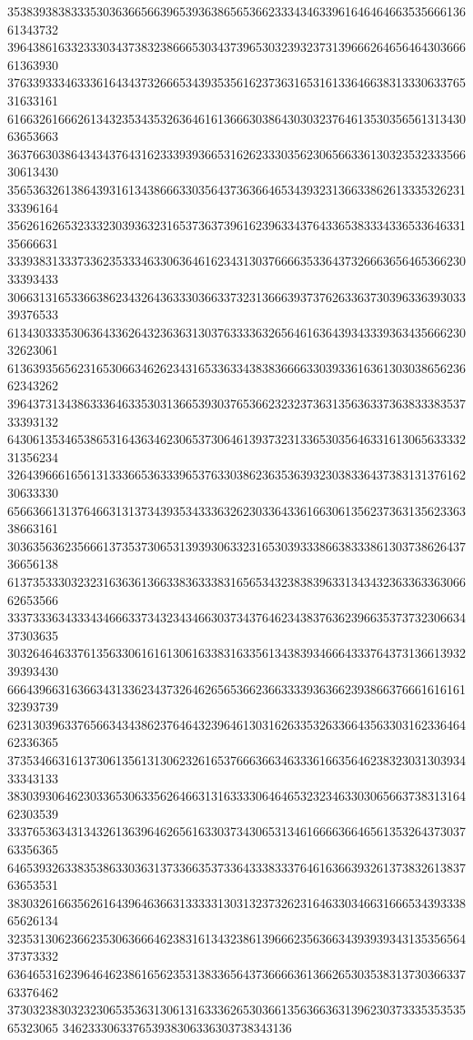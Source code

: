 35383938383335303636656639653936386565366233343463396164646466353566613661343732
39643861633233303437383238666530343739653032393237313966626465646430366661363930
37633933346333616434373266653439353561623736316531613364663831333063376531633161
61663261666261343235343532636461613666303864303032376461353035656131343063653663
36376630386434343764316233393936653162623330356230656633613032353233356630613430
35653632613864393161343866633035643736366465343932313663386261333532623133396164
35626162653233323039363231653736373961623963343764336538333433653364633135666631
33393831333733623533346330636461623431303766663533643732666365646536623033393433
30663131653366386234326436333036633732313666393737626336373039633639303339376533
61343033353063643362643236363130376333363265646163643934333936343566623032623061
61363935656231653066346262343165336334383836666330393361636130303865623662343262
39643731343863336463353031366539303765366232323736313563633736383338353733393132
64306135346538653164363462306537306461393732313365303564633161306563333231356234
32643966616561313336653633396537633038623635363932303833643738313137616230633330
65663661313764663131373439353433363262303364336166306135623736313562336338663161
30363563623566613735373065313939306332316530393338663833386130373862643736656138
61373533303232316363613663383633383165653432383839633134343236336336306662653566
33373336343334346663373432343466303734376462343837636239663537373230663437303635
30326464633761356330616161306163383163356134383934666433376437313661393239393430
66643966316366343133623437326462656536623663333936366239386637666161616132393739
62313039633765663434386237646432396461303162633532633664356330316233646462336365
37353466316137306135613130623261653766636634633361663564623832303130393433343133
38303930646230336530633562646631316333306464653232346330306566373831316462303539
33376536343134326136396462656163303734306531346166663664656135326437303763356365
64653932633835386330363137336635373364333833376461636639326137383261383763653531
38303261663562616439646366313333313031323732623164633034663166653439333865626134
32353130623662353063666462383161343238613966623563663439393934313535656437373332
63646531623964646238616562353138336564373666636136626530353831373036633763376462
37303238303232306535363130613163336265303661356366363139623037333535353565323065
346233306337653938306336303738343136
